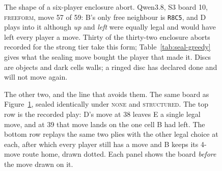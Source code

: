 \begin{figure}[tbp]
    \centering
    \caption{The shape of a six-player enclosure abort. Qwen3.8, S3 board 10, \textsc{freeform}, move 57 of 59: B's only free neighbour is \texttt{R8C5}, and D plays into it although \emph{up} and \emph{left} were equally legal and would have left every player a move. Thirty of the thirty-two enclosure aborts recorded for the strong tier take this form; Table~\ref{tab:seal-greedy} gives what the sealing move bought the player that made it. Discs are objects and dark cells walls; a ringed disc has declared done and will not move again.}
    \label{fig:abort-avoidable}
\end{figure}

\begin{figure}[p]
    \centering
    \caption{The other two, and the line that avoids them. The same board as Figure~\ref{fig:abort-avoidable}, sealed identically under \textsc{none} and \textsc{structured}. The top row is the recorded play: D's move at 38 leaves E a single legal move, and at 39 that move lands on the one cell B had left. The bottom row replays the same two plies with the other legal choice at each, after which every player still has a move and B keeps its 4-move route home, drawn dotted. Each panel shows the board \emph{before} the move drawn on it.}
    \label{fig:abort-forced}
\end{figure}
